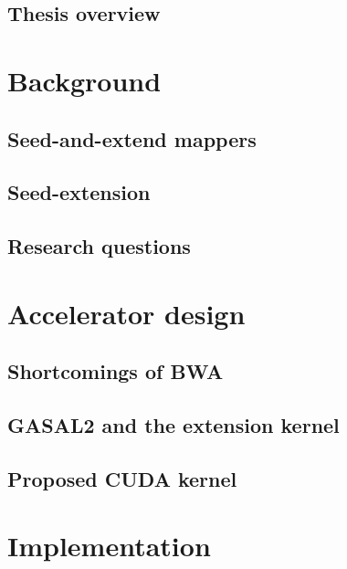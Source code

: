 \documentclass[11pt,twoside]{ce}
\begin{document}
\section{Thesis overview}


\chapter{Background}
\label{chap:background}
\section{Seed-and-extend mappers}


\section{Seed-extension}




\section{Research questions}


\chapter{Accelerator design}
\label{chap:accel}


\section{Shortcomings of BWA}

\section{GASAL2 and the extension kernel}
	

\section{Proposed CUDA kernel}


\chapter{Implementation}
\label{chap:implementation}

\end{document}
